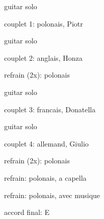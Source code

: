 \IncludeLilypondShift

\vfil\eject

guitar solo

couplet 1: polonais, Piotr

guitar solo

couplet 2: anglais, Honza

refrain (2x): polonais

guitar solo

couplet 3: francais, Donatella

guitar solo

couplet 4: allemand, Giulio

refrain (2x): polonais

refrain: polonais, a capella

refrain: polonais, avec musique

accord final: E
